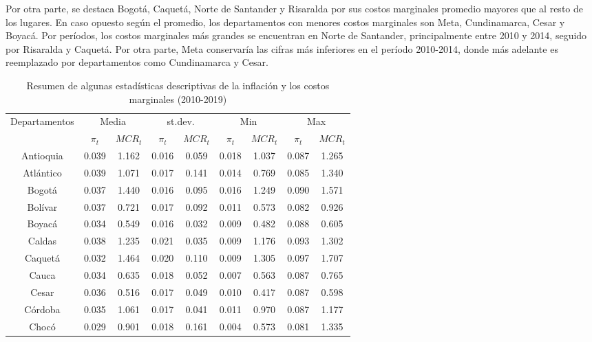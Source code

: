 Por otra parte, se destaca  Bogotá, Caquetá, Norte de Santander y Risaralda por sus costos marginales promedio mayores que al resto de los lugares. En caso opuesto según el promedio, los departamentos con menores costos marginales son Meta, Cundinamarca, Cesar y Boyacá. Por períodos, los costos marginales más grandes se encuentran en Norte de Santander, principalmente entre 2010 y 2014, seguido por Risaralda y Caquetá. Por otra parte, Meta conservaría las cifras más inferiores en el período 2010-2014, donde más adelante es reemplazado por departamentos como Cundinamarca y Cesar.



\begin{table}[H]
  \centering
  \caption{Resumen de algunas estadísticas descriptivas de la inflación y los costos marginales (2010-2019)}
    \begin{tabular}{c c c c c c c c c }
     \hline
    \multirow{2}{*}{Departamentos}& \multicolumn{2}{c}{Media} & \multicolumn{2}{c}{st.dev.}& \multicolumn{2}{c}{Min} & \multicolumn{2}{c}{Max}  \\
     &      $\pi_{t}$ & $MCR_{t}$ & $\pi_{t}$ & $MCR_{t}$ & $\pi_{t}$ & $MCR_{t}$ & $\pi_{t}$ & $MCR_{t}$ \\
      \hline
       \hline
    Antioquia  & 0.039 & 1.162 & 0.016 & 0.059 & 0.018 & 1.037 & 0.087 & 1.265 \\
    Atlántico  & 0.039 & 1.071 & 0.017 & 0.141 & 0.014 & 0.769 & 0.085 & 1.340 \\ Bogotá & 0.037 & 1.440 & 0.016 & 0.095 & 0.016 & 1.249 & 0.090 & 1.571 \\
    Bolívar  & 0.037 & 0.721 & 0.017 & 0.092 & 0.011 & 0.573 & 0.082 & 0.926 \\
    Boyacá  & 0.034 & 0.549 & 0.016 & 0.032 & 0.009 & 0.482 & 0.088 & 0.605 \\
    Caldas  & 0.038 & 1.235 & 0.021 & 0.035 & 0.009 & 1.176 & 0.093 & 1.302 \\
    Caquetá  & 0.032 & 1.464 & 0.020 & 0.110 & 0.009 & 1.305 & 0.097 & 1.707 \\
    Cauca  & 0.034 & 0.635 & 0.018 & 0.052 & 0.007 & 0.563 & 0.087 & 0.765 \\
    Cesar  & 0.036 & 0.516 & 0.017 & 0.049 & 0.010 & 0.417 & 0.087 & 0.598 \\
    Córdoba  & 0.035 & 1.061 & 0.017 & 0.041 & 0.011 & 0.970 & 0.087 & 1.177 \\
    Chocó  & 0.029 & 0.901 & 0.018 & 0.161 & 0.004 & 0.573 & 0.081 & 1.335 \\

\end{tabular}
\end{table}
